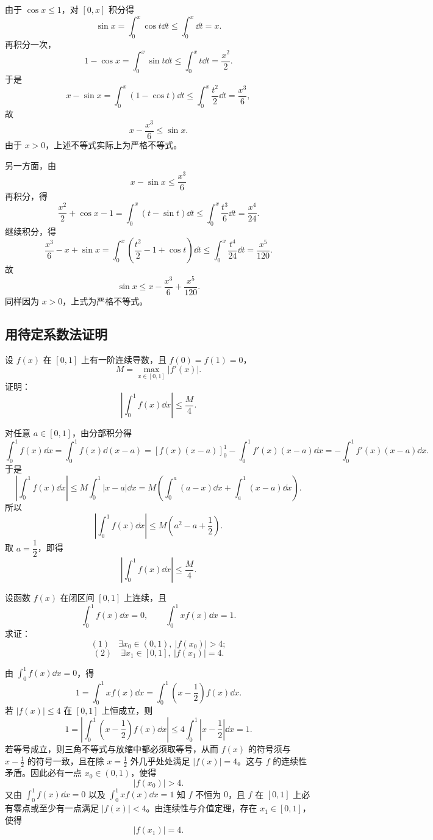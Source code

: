 \begin{solution}
	由于 $\cos x\leq1$，对 $[0,x]$ 积分得
	\[
	\sin x=\int_0^x\cos t\dd t\leq\int_0^x\dd t=x.
	\]
	再积分一次，
	\[
	1-\cos x=\int_0^x\sin t\dd t\leq\int_0^x t\dd t=\frac{x^2}{2}.
	\]
	于是
	\[
	x-\sin x=\int_0^x(1-\cos t)\dd t
	\leq\int_0^x\frac{t^2}{2}\dd t=\frac{x^3}{6},
	\]
	故
	\[
	x-\frac{x^3}{6}\leq\sin x.
	\]
	由于 $x>0$，上述不等式实际上为严格不等式。
	
	另一方面，由
	\[
	x-\sin x\leq\frac{x^3}{6}
	\]
	再积分，得
	\[
	\frac{x^2}{2}+\cos x-1
	=\int_0^x(t-\sin t)\dd t
	\leq\int_0^x\frac{t^3}{6}\dd t=\frac{x^4}{24}.
	\]
	继续积分，得
	\[
	\frac{x^3}{6}-x+\sin x
	=\int_0^x\left(\frac{t^2}{2}-1+\cos t\right)\dd t
	\leq\int_0^x\frac{t^4}{24}\dd t
	=\frac{x^5}{120}.
	\]
	故
	\[
	\sin x\leq x-\frac{x^3}{6}+\frac{x^5}{120}.
	\]
	同样因为 $x>0$，上式为严格不等式。
\end{solution}

\subsection*{用待定系数法证明}

\begin{problem}
	设 $f(x)$ 在 $[0,1]$ 上有一阶连续导数，且 $f(0)=f(1)=0$，
	\[
	M=\max_{x\in[0,1]}|f'(x)|.
	\]
	证明：
	\[
	\left|\int_0^1 f(x)\dd x\right|\leq \frac{M}{4}.
	\]
\end{problem}

\begin{solution}
	对任意 $a\in[0,1]$，由分部积分得
	\[
	\int_0^1 f(x)\dd x
	=\int_0^1 f(x)\dd(x-a)
	=[f(x)(x-a)]_0^1-\int_0^1 f'(x)(x-a)\dd x
	=-\int_0^1 f'(x)(x-a)\dd x.
	\]
	于是
	\[
	\left|\int_0^1 f(x)\dd x\right|
	\leq
	M\int_0^1|x-a|\dd x
	=M\left(\int_0^a(a-x)\dd x+\int_a^1(x-a)\dd x\right).
	\]
	所以
	\[
	\left|\int_0^1 f(x)\dd x\right|
	\leq
	M\left(a^2-a+\frac12\right).
	\]
	取 $a=\dfrac12$，即得
	\[
	\left|\int_0^1 f(x)\dd x\right|\leq \frac{M}{4}.
	\]
\end{solution}

\begin{problem}
	设函数 $f(x)$ 在闭区间 $[0,1]$ 上连续，且
	\[
	\int_0^1 f(x)\dd x=0,\qquad
	\int_0^1 x f(x)\dd x=1.
	\]
	求证：
	\[
	(1)\quad \exists x_0\in(0,1),\ |f(x_0)|>4;
	\]
	\[
	(2)\quad \exists x_1\in[0,1],\ |f(x_1)|=4.
	\]
\end{problem}

\begin{solution}
	由 $\int_0^1 f(x)\dd x=0$，得
	\[
	1=\int_0^1 x f(x)\dd x
	=\int_0^1\left(x-\frac12\right)f(x)\dd x.
	\]
	若 $|f(x)|\leq4$ 在 $[0,1]$ 上恒成立，则
	\[
	1
	=\left|\int_0^1\left(x-\frac12\right)f(x)\dd x\right|
	\leq
	4\int_0^1\left|x-\frac12\right|\dd x
	=1.
	\]
	若等号成立，则三角不等式与放缩中都必须取等号，从而 $f(x)$ 的符号须与 $x-\frac12$ 的符号一致，且在除 $x=\frac12$ 外几乎处处满足 $|f(x)|=4$。这与 $f$ 的连续性矛盾。因此必有一点 $x_0\in(0,1)$，使得
	\[
	|f(x_0)|>4.
	\]
	又由 $\int_0^1 f(x)\dd x=0$ 以及 $\int_0^1 x f(x)\dd x=1$ 知 $f$ 不恒为 $0$，且 $f$ 在 $[0,1]$ 上必有零点或至少有一点满足 $|f(x)|<4$。由连续性与介值定理，存在 $x_1\in[0,1]$，使得
	\[
	|f(x_1)|=4.
	\]
\end{solution}

